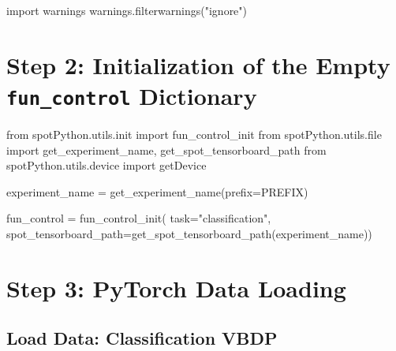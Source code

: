 \documentclass[
  letterpaper,
  DIV=11,
  numbers=noendperiod]{scrreprt}
\newenvironment{Shaded}{\begin{snugshade}}{\end{snugshade}}
\newcommand{\BuiltInTok}[1]{\textcolor[rgb]{0.00,0.23,0.31}{#1}}
\newcommand{\ImportTok}[1]{\textcolor[rgb]{0.00,0.46,0.62}{#1}}
\newcommand{\NormalTok}[1]{\textcolor[rgb]{0.00,0.23,0.31}{#1}}
\newcommand{\OperatorTok}[1]{\textcolor[rgb]{0.37,0.37,0.37}{#1}}
\newcommand{\StringTok}[1]{\textcolor[rgb]{0.13,0.47,0.30}{#1}}
\begin{document}
\begin{Shaded}
\begin{Highlighting}[]
\ImportTok{import}\NormalTok{ warnings}
\NormalTok{warnings.filterwarnings(}\StringTok{"ignore"}\NormalTok{)}
\end{Highlighting}
\end{Shaded}

\hypertarget{step-2-initialization-of-the-empty-fun_control-dictionary-1}{%
\section{\texorpdfstring{Step 2: Initialization of the Empty
\texttt{fun\_control}
Dictionary}{Step 2: Initialization of the Empty fun\_control Dictionary}}\label{step-2-initialization-of-the-empty-fun_control-dictionary-1}}

\begin{Shaded}
\begin{Highlighting}[]
\ImportTok{from}\NormalTok{ spotPython.utils.init }\ImportTok{import}\NormalTok{ fun\_control\_init}
\ImportTok{from}\NormalTok{ spotPython.utils.}\BuiltInTok{file} \ImportTok{import}\NormalTok{ get\_experiment\_name, get\_spot\_tensorboard\_path}
\ImportTok{from}\NormalTok{ spotPython.utils.device }\ImportTok{import}\NormalTok{ getDevice}

\NormalTok{experiment\_name }\OperatorTok{=}\NormalTok{ get\_experiment\_name(prefix}\OperatorTok{=}\NormalTok{PREFIX)}

\NormalTok{fun\_control }\OperatorTok{=}\NormalTok{ fun\_control\_init(}
\NormalTok{    task}\OperatorTok{=}\StringTok{"classification"}\NormalTok{,}
\NormalTok{    spot\_tensorboard\_path}\OperatorTok{=}\NormalTok{get\_spot\_tensorboard\_path(experiment\_name))}
\end{Highlighting}
\end{Shaded}

\hypertarget{step-3-pytorch-data-loading}{%
\section{Step 3: PyTorch Data
Loading}\label{step-3-pytorch-data-loading}}

\hypertarget{load-data-classification-vbdp}{%
\subsection{Load Data: Classification
VBDP}\label{load-data-classification-vbdp}}
\end{document}
